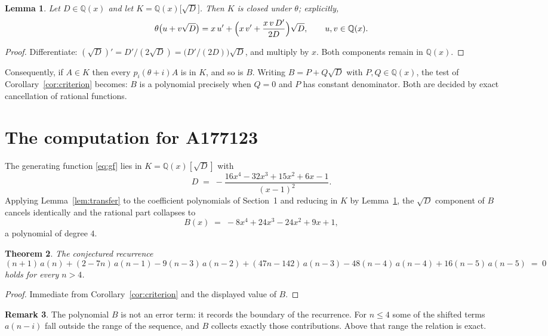 \documentclass[11pt,a4paper]{article}
\theoremstyle{plain}
\newtheorem{theorem}{Theorem}
\newtheorem{lemma}[theorem]{Lemma}
\theoremstyle{definition}
\newtheorem{remark}[theorem]{Remark}
\begin{document}
\begin{lemma}\label{lem:field}
Let $D\in\mathbb{Q}(x)$ and let $K=\mathbb{Q}(x)\bigl[\sqrt{D}\bigr]$. Then $K$ is closed
under $\theta$; explicitly,
\[
\theta\bigl(u+v\sqrt{D}\bigr)=x\,u'+\Bigl(x\,v'+\frac{x\,v\,D'}{2D}\Bigr)\sqrt{D},
\qquad u,v\in\mathbb{Q}(x).
\]
\end{lemma}

\begin{proof}
Differentiate: $(\sqrt{D})'=D'/(2\sqrt{D})=\bigl(D'/(2D)\bigr)\sqrt{D}$, and multiply by
$x$. Both components remain in $\mathbb{Q}(x)$.
\end{proof}

Consequently, if $A\in K$ then every $p_{i}(\theta+i)A$ is in $K$, and so is $B$. Writing
$B=P+Q\sqrt{D}$ with $P,Q\in\mathbb{Q}(x)$, the test of Corollary~\ref{cor:criterion}
becomes: $B$ is a polynomial precisely when $Q=0$ and $P$ has constant denominator. Both
are decided by exact cancellation of rational functions.

\section{The computation for A177123}

The generating function \eqref{eq:gf} lies in $K=\mathbb{Q}(x)[\sqrt{D}]$ with
\[
D \;=\; - \frac{16 x^{4} - 32 x^{3} + 15 x^{2} + 6 x - 1}{\left(x - 1\right)^{2}} .
\]
Applying Lemma~\ref{lem:transfer} to the coefficient polynomials of Section~1 and reducing
in $K$ by Lemma~\ref{lem:field}, the $\sqrt{D}$ component of $B$ cancels identically and
the rational part collapses to
\[
B(x)\;=\;- 8 x^{4} + 24 x^{3} - 24 x^{2} + 9 x + 1 ,
\]
a polynomial of degree $4$.

\begin{theorem}
The conjectured recurrence
\[
(n + 1)\,a(n) + (2 - 7 n)\,a(n-1) -  9 \left(n - 3\right)\,a(n-2) + (47 n - 142)\,a(n-3) -  48 \left(n - 4\right)\,a(n-4) + 16 \left(n - 5\right)\,a(n-5) \;=\;0
\]
holds for every $n>4$.
\end{theorem}

\begin{proof}
Immediate from Corollary~\ref{cor:criterion} and the displayed value of $B$.
\end{proof}

\begin{remark}
The polynomial $B$ is not an error term: it records the boundary of the recurrence. For
$n\le4$ some of the shifted terms $a(n-i)$ fall outside the range of the sequence,
and $B$ collects exactly those contributions. Above that range the relation is exact.
\end{remark}
\end{document}
